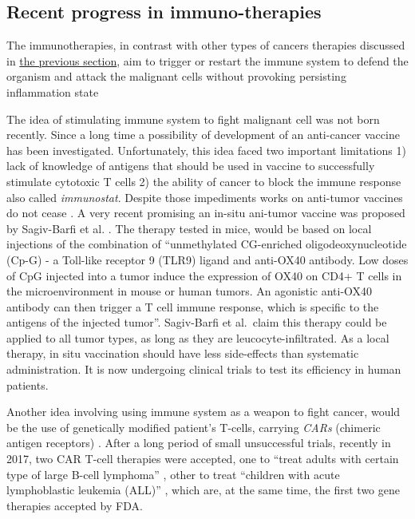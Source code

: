\documentclass[12pt,]{book}
\theoremstyle{definition}
\theoremstyle{definition}
\theoremstyle{definition}
\theoremstyle{remark}
\begin{document}
\hypertarget{recent-progress-in-immuno-therapies}{%
\subsection{Recent progress in
immuno-therapies}\label{recent-progress-in-immuno-therapies}}

The immunotherapies, in contrast with other types of cancers therapies
discussed in \protect\hyperlink{cancer_Therapies}{the previous section},
aim to trigger or restart the immune system to defend the organism and
attack the malignant cells without provoking persisting inflammation
state \citep{Predina2013}

The idea of stimulating immune system to fight malignant cell was not
born recently. Since a long time a possibility of development of an
anti-cancer vaccine has been investigated. Unfortunately, this idea
faced two important limitations 1) lack of knowledge of antigens that
should be used in vaccine to successfully stimulate cytotoxic T cells 2)
the ability of cancer to block the immune response also called
\emph{immunostat}. Despite those impediments works on anti-tumor
vaccines do not cease \citep{Palucka2013}. A very recent promising an
in-situ ani-tumor vaccine was proposed by Sagiv-Barfi et al.
\citep{Sagiv-Barfi2018}. The therapy tested in mice, would be based on
local injections of the combination of ``unmethylated CG-enriched
oligodeoxynucleotide (Cp-G) - a Toll-like receptor 9 (TLR9) ligand and
anti-OX40 antibody. Low doses of CpG injected into a tumor induce the
expression of OX40 on CD4+ T cells in the microenvironment in mouse or
human tumors. An agonistic anti-OX40 antibody can then trigger a T cell
immune response, which is specific to the antigens of the injected
tumor''. Sagiv-Barfi et al.~claim this therapy could be applied to all
tumor types, as long as they are leucocyte-infiltrated. As a local
therapy, in situ vaccination should have less side-effects than
systematic administration. It is now undergoing clinical trials to test
its efficiency in human patients.

Another idea involving using immune system as a weapon to fight cancer,
would be the use of genetically modified patient's T-cells, carrying
\emph{CARs} (chimeric antigen receptors) \citep{Jackson2016}. After a
long period of small unsuccessful trials, recently in 2017, two CAR
T-cell therapies were accepted, one to ``treat adults with certain type
of large B-cell lymphoma'' \citep{FDACARTadult}, other to treat
``children with acute lymphoblastic leukemia (ALL)'' \citep{FDACARTALL}
, which are, at the same time, the first two gene therapies accepted by
FDA.
\end{document}
